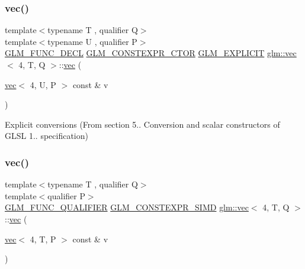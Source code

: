 \subsubsection{\texorpdfstring{vec()}{vec()}\hspace{0.1cm}{\footnotesize\ttfamily [19/34]}}
{\footnotesize\ttfamily template$<$typename T , qualifier Q$>$ \\
template$<$typename U , qualifier P$>$ \\
\hyperlink{setup_8hpp_ab2d052de21a70539923e9bcbf6e83a51}{G\+L\+M\+\_\+\+F\+U\+N\+C\+\_\+\+D\+E\+CL} \hyperlink{setup_8hpp_ad34178a09666081abdb573c14d1f4a5a}{G\+L\+M\+\_\+\+C\+O\+N\+S\+T\+E\+X\+P\+R\+\_\+\+C\+T\+OR} \hyperlink{setup_8hpp_a6c74f5a5e7b134ab69023ff9a30d4d5d}{G\+L\+M\+\_\+\+E\+X\+P\+L\+I\+C\+IT} \hyperlink{structglm_1_1vec}{glm\+::vec}$<$ 4, T, Q $>$\+::\hyperlink{structglm_1_1vec}{vec} (\begin{DoxyParamCaption}\item[{\hyperlink{structglm_1_1vec}{vec}$<$ 4, U, P $>$ const \&}]{v }\end{DoxyParamCaption})}



Explicit conversions (From section 5.. Conversion and scalar constructors of G\+L\+SL 1.. specification) 

\mbox{\label{structglm_1_1vec_3_014_00_01_t_00_01_q_01_4_a29d7b0c6bd124719542646f92272f061}} 
\subsubsection{\texorpdfstring{vec()}{vec()}\hspace{0.1cm}{\footnotesize\ttfamily [20/34]}}
{\footnotesize\ttfamily template$<$typename T , qualifier Q$>$ \\
template$<$qualifier P$>$ \\
\hyperlink{setup_8hpp_a33fdea6f91c5f834105f7415e2a64407}{G\+L\+M\+\_\+\+F\+U\+N\+C\+\_\+\+Q\+U\+A\+L\+I\+F\+I\+ER} \hyperlink{setup_8hpp_ae5de828d10226b21e2123dd61f3cb5ed}{G\+L\+M\+\_\+\+C\+O\+N\+S\+T\+E\+X\+P\+R\+\_\+\+S\+I\+MD} \hyperlink{structglm_1_1vec}{glm\+::vec}$<$ 4, T, Q $>$\+::\hyperlink{structglm_1_1vec}{vec} (\begin{DoxyParamCaption}\item[{\hyperlink{structglm_1_1vec}{vec}$<$ 4, T, P $>$ const \&}]{v }\end{DoxyParamCaption})}



